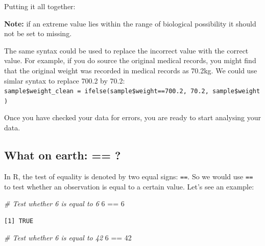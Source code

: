 \documentclass[
  a4paper,
]{memoir}
\newenvironment{Shaded}{\begin{snugshade}}{\end{snugshade}}
\newcommand{\CommentTok}[1]{\textcolor[rgb]{0.00,0.00,0.00}{\textit{#1}}}
\newcommand{\ConstantTok}[1]{\textcolor[rgb]{0.00,0.00,0.00}{#1}}
\newcommand{\DecValTok}[1]{\textcolor[rgb]{0.00,0.00,0.00}{#1}}
\newcommand{\FloatTok}[1]{\textcolor[rgb]{0.00,0.00,0.00}{#1}}
\newcommand{\FunctionTok}[1]{\textcolor[rgb]{0.00,0.00,0.00}{#1}}
\newcommand{\NormalTok}[1]{\textcolor[rgb]{0.00,0.00,0.00}{#1}}
\newcommand{\OtherTok}[1]{\textcolor[rgb]{0.00,0.00,0.00}{#1}}
\newcommand{\SpecialCharTok}[1]{\textcolor[rgb]{0.00,0.00,0.00}{#1}}
\begin{document}
Putting it all together:

\begin{Shaded}
\end{Shaded}

\textbf{Note:} if an extreme value lies within the range of biological
possibility it should not be set to missing.

The same syntax could be used to replace the incorrect value with the
correct value. For example, if you do source the original medical
records, you might find that the original weight was recorded in medical
records as 70.2kg. We could use simlar syntax to replace 700.2 by 70.2:
\texttt{sample\$weight\_clean\ =\ ifelse(sample\$weight==700.2,\ 70.2,\ sample\$weight)}

Once you have checked your data for errors, you are ready to start
analysing your data.

\subsection{What on earth: == ?}\label{what-on-earth}

In R, the test of equality is denoted by two equal signs: \texttt{==}.
So we would use \texttt{==} to test whether an observation is equal to a
certain value. Let's see an example:

\begin{Shaded}
\begin{Highlighting}[]
\CommentTok{\# Test whether 6 is equal to 6}
\DecValTok{6} \SpecialCharTok{==} \DecValTok{6}
\end{Highlighting}
\end{Shaded}

\begin{verbatim}
[1] TRUE
\end{verbatim}

\begin{Shaded}
\begin{Highlighting}[]
\CommentTok{\# Test whether 6 is equal to 42}
\DecValTok{6} \SpecialCharTok{==} \DecValTok{42}
\end{Highlighting}
\end{Shaded}
\end{document}
